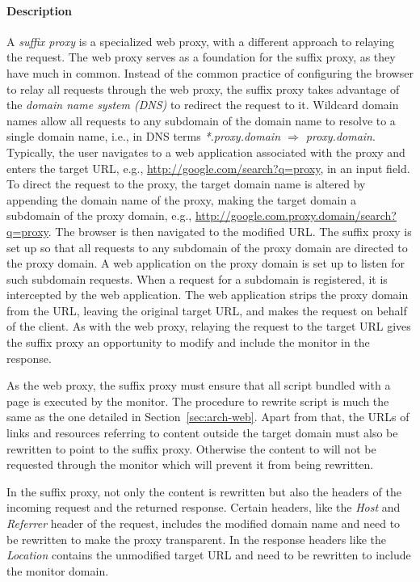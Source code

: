 \documentclass{llncs}
\begin{document}
\paragraph{Description}
A \emph{suffix proxy} is a specialized web proxy, with a different approach to relaying the request. 
The web proxy serves as a foundation for the suffix proxy, as they have much in common.
Instead of the common practice of configuring the browser to relay all requests through the web proxy,
the suffix proxy takes advantage of the \emph{domain name system (DNS)} to redirect the request to it.
Wildcard domain names allow all requests to any subdomain of the domain name to resolve to a single domain name, 
i.e., in DNS terms \emph{*.proxy.domain $\Rightarrow$ proxy.domain}.
Typically, the user navigates to a 
web application associated with the proxy and enters the target URL, e.g., \url{http://google.com/search?q=proxy}, in 
an input field. To direct the request to the proxy, the target domain name is altered
by appending the domain name of the proxy, making the target domain a subdomain of the proxy domain, e.g., \url{http://google.com.proxy.domain/search?q=proxy}. 
The browser is then navigated to the modified URL.
The suffix proxy is set up so
that all requests to any subdomain of the proxy domain are directed to the proxy domain. 
A web application on the proxy domain is set up to listen for such subdomain requests.
When a request for a subdomain is registered, it is intercepted by the web application.
The web application strips the proxy domain from the URL, leaving the original target URL, 
and makes the request on behalf of the client. As with the web proxy, 
relaying the request to the target URL gives the suffix proxy an opportunity to modify and 
include the monitor in the response.

As the web proxy, the suffix proxy must ensure that all script bundled with a 
page is executed by the monitor. The procedure to rewrite script is much the same as the one
detailed in Section~\ref{sec:arch-web}. Apart from that, the URLs of links and 
resources referring to content outside the target domain must also be rewritten to point to the suffix proxy. 
Otherwise the content to will not be requested through the monitor which will 
prevent it from being rewritten.


In the suffix proxy, not only the content is rewritten
but also the headers of the incoming request and the returned response.
Certain headers, like the \emph{Host} and \emph{Referrer} header of the request, includes the 
modified domain name and need to be rewritten to make the proxy transparent. In 
the response headers like the \emph{Location} contains the unmodified target URL and 
need to be rewritten to include the monitor domain. 
\end{document}
